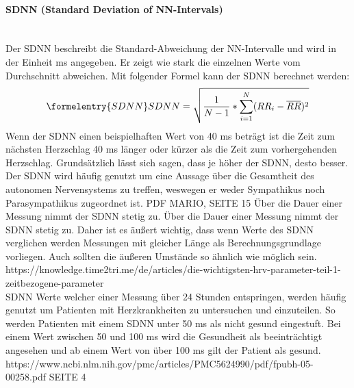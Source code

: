 \paragraph{SDNN (Standard Deviation of NN-Intervals)}\mbox{} \\
Der SDNN beschreibt die Standard-Abweichung der NN-Intervalle und wird in der Einheit ms angegeben. Er zeigt wie stark die einzelnen Werte vom Durchschnitt abweichen. Mit folgender Formel kann der SDNN berechnet werden: 
\begin{equation}\formelentry{SDNN}
SDNN = \sqrt{\dfrac{1}{N-1} * \sum\limits_{i=1}^{N}  (RR_i - \overline{RR})^{2}}
\end{equation}
Wenn der SDNN einen beispielhaften Wert von 40 ms beträgt ist die Zeit zum nächsten Herzschlag 40 ms länger oder kürzer als die Zeit zum vorhergehenden Herzschlag. Grundsätzlich lässt sich sagen, dass je höher der SDNN, desto besser.\\

Der SDNN wird häufig genutzt um eine Aussage über die Gesamtheit des autonomen Nervensystems zu treffen, weswegen er weder Sympathikus noch Parasympathikus zugeordnet ist. PDF MARIO, SEITE 15\color{red} Über die Dauer einer Messung nimmt der SDNN stetig zu.\color{black} Über die Dauer einer Messung nimmt der SDNN stetig zu. Daher ist es äußert wichtig, dass wenn Werte des SDNN verglichen werden Messungen mit gleicher Länge als Berechnungsgrundlage vorliegen. Auch sollten die äußeren Umstände so ähnlich wie möglich sein. https://knowledge.time2tri.me/de/articles/die-wichtigsten-hrv-parameter-teil-1-zeitbezogene-parameter\\
SDNN Werte welcher einer Messung über 24 Stunden entspringen, werden häufig genutzt um Patienten mit Herzkrankheiten zu untersuchen und einzuteilen. So werden Patienten mit einem SDNN unter 50 ms als nicht gesund eingestuft. Bei einem Wert zwischen 50 und 100 ms wird die Gesundheit als beeinträchtigt angesehen und ab einem Wert von über 100 ms gilt der Patient als gesund. https://www.ncbi.nlm.nih.gov/pmc/articles/PMC5624990/pdf/fpubh-05-00258.pdf SEITE 4

